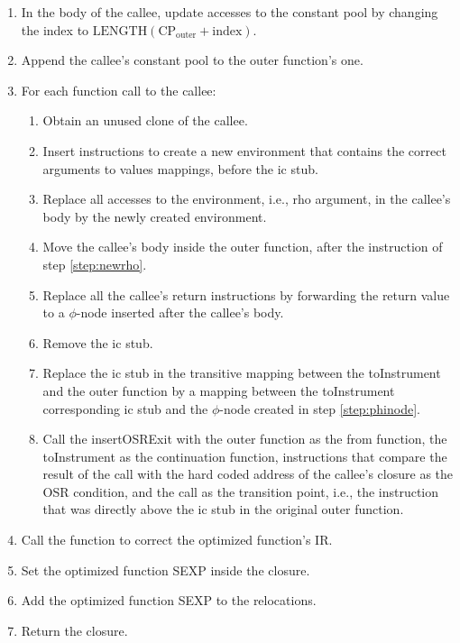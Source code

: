 \begin{enumerate}
    \item In the body of the callee, update accesses to the constant pool by changing the index to $\text{LENGTH}(\text{CP}_{\text{outer}} + \text{index})$.
    \item Append the callee's constant pool to the outer function's one.
    \item For each function call to the callee:
        \begin{enumerate}
            \item Obtain an unused clone of the callee.
            \item Insert instructions to create a new environment that contains the correct arguments to values mappings, before the ic stub.\label{step:newrho}
            \item Replace all accesses to the environment, i.e., rho argument, in the callee's body by the newly created environment.
            \item Move the callee's body inside the outer function, after the instruction of step \ref{step:newrho}.
            \item Replace all the callee's return instructions by forwarding the return value to a $\phi$-node inserted after the callee's body.\label{step:phinode}
            \item Remove the ic stub.
            \item Replace the ic stub in the transitive mapping between the toInstrument and the outer function by a mapping between the toInstrument corresponding ic stub and the $\phi$-node created in step \ref{step:phinode}.\label{step:updatemap}
            \item Call the insertOSRExit with the outer function as the from function, the toInstrument as the continuation function, instructions that compare the result of the  call with the hard coded address of the callee's closure as the OSR condition, and the  call as the transition point, i.e., the instruction that was directly above the ic stub in the original outer function.
        \end{enumerate}
    \item Call the  function to correct the optimized function's IR.
    \item Set the optimized function SEXP inside the closure.
    \item Add the optimized function SEXP to the relocations.
    \item Return the closure.
\end{enumerate}

